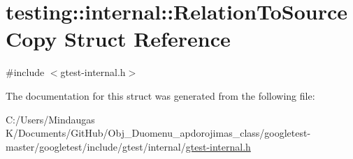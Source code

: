 \hypertarget{structtesting_1_1internal_1_1_relation_to_source_copy}{}\section{testing\+::internal\+::Relation\+To\+Source\+Copy Struct Reference}
\label{structtesting_1_1internal_1_1_relation_to_source_copy}


{\ttfamily \#include $<$gtest-\/internal.\+h$>$}



The documentation for this struct was generated from the following file\+:\begin{DoxyCompactItemize}
\item 
C\+:/\+Users/\+Mindaugas K/\+Documents/\+Git\+Hub/\+Obj\+\_\+\+Duomenu\+\_\+apdorojimas\+\_\+class/googletest-\/master/googletest/include/gtest/internal/\mbox{\hyperlink{googletest-master_2googletest_2include_2gtest_2internal_2gtest-internal_8h}{gtest-\/internal.\+h}}\end{DoxyCompactItemize}
